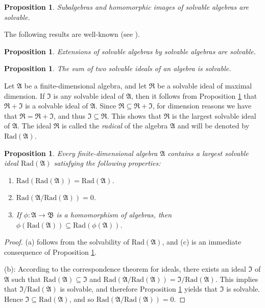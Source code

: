 \documentclass{amsart}
\newtheorem{pro}[thm]{Proposition}
\numberwithin{equation}{section}
\newcommand{\rad}{\mathrm{Rad}}
\newcommand{\af}{\mathfrak{A}}
\newcommand{\rf}{\mathfrak{R}}
\newcommand{\Bf}{\mathfrak{B}}
\newcommand{\If}{\mathfrak{I}}
\begin{document}
\begin{pro}\label{subalghomimsolv}
Subalgebras and homomorphic images of solvable algebras are solvable.
\end{pro}

The following results are well-known (see \cite[Proposition 2.2 and 2.3]{S}).

\begin{pro}\label{extsolv}
Extensions of solvable algebras by solvable algebras are solvable.
\end{pro}

\begin{pro}\label{sumidsolv}
The sum of two solvable ideals of an algebra is solvable.
\end{pro}

Let $\af$ be a finite-dimensional algebra, and let $\rf$ be a solvable ideal of maximal dimension.
If $\If$ is any solvable ideal of $\af$, then it follows from Proposition \ref{sumidsolv} that $\rf+
\If$ is a solvable ideal of $\af$. Since $\rf\subseteq\rf+\If$, for dimension reasons we have that
$\rf=\rf+\If$, and thus $\If\subseteq\rf$. This shows that $\rf$ is the largest solvable ideal of
$\af$. The ideal $\rf$ is called the {\em radical\/} of the algebra $\af$ and will be denoted by
$\rad(\af)$.

\begin{pro}\label{rad}
Every finite-dimensional algebra $\af$ contains a largest solvable ideal $\rad(\af)$ satisfying the
following properties:
\begin{enumerate}
\item[(a)] $\rad(\rad(\af))=\rad(\af)$.
\item[(b)] $\rad(\af/\rad(\af))=0$.
\item[(c)] If $\phi:\af\to\Bf$ is a homomorphism of algebras, then $\phi(\rad(\af))\subseteq\rad
                (\phi(\af))$.
\end{enumerate}
\end{pro}

\begin{proof}
(a) follows from the solvability of $\rad(\af)$, and (c) is an immediate consequence of Proposition
\ref{subalghomimsolv}.

(b): According to the correspondence theorem for ideals, there exists an ideal $\If$ of $\af$ such
that $\rad(\af)\subseteq\If$ and $\rad(\af/\rad(\af))=\If/\rad(\af)$. This implies that $\If/\rad(\af)$
is solvable, and therefore Proposition \ref{extsolv} yields that $\If$ is solvable. Hence $\If\subseteq
\rad(\af)$, and so $\rad(\af/\rad(\af))=0$.
\end{proof}
\end{document}

